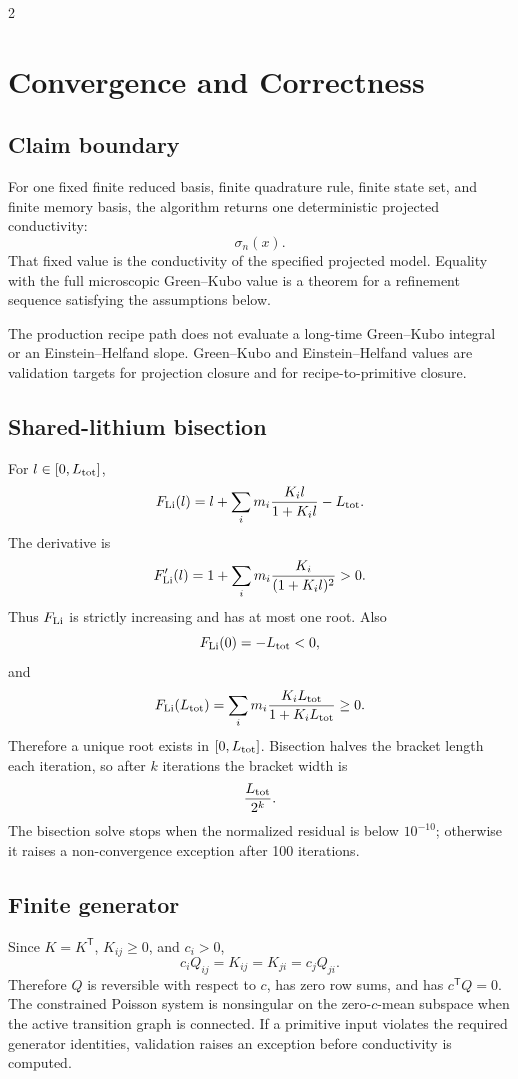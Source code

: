 \documentclass[10pt]{article}
\newcommand{\T}{\mathsf{T}}
\begin{document}
\begin{multicols}{2}
\section{Convergence and Correctness}
\label{sec:convergenceproof}

\subsection{Claim boundary}

For one fixed finite reduced basis, finite quadrature rule, finite state set,
and finite memory basis, the algorithm returns one deterministic projected
conductivity:
\[
\sigma_n(x).
\]
That fixed value is the conductivity of the specified projected model. Equality
with the full microscopic Green--Kubo value is a theorem for a refinement
sequence satisfying the assumptions below.

The production recipe path does not evaluate a long-time Green--Kubo integral
or an Einstein--Helfand slope. Green--Kubo and Einstein--Helfand values are
validation targets for projection closure and for recipe-to-primitive closure.

\subsection{Shared-lithium bisection}

For \(l\in[0,L_{\rm tot}]\),
\[
F_{\rm Li}(l)=l+\sum_i m_i\frac{K_i l}{1+K_i l}-L_{\rm tot}.
\]
The derivative is
\[
F'_{\rm Li}(l)
=
1+\sum_i m_i\frac{K_i}{(1+K_i l)^2}
>0.
\]
Thus \(F_{\rm Li}\) is strictly increasing and has at most one root. Also
\[
F_{\rm Li}(0)=-L_{\rm tot}<0,
\]
and
\[
F_{\rm Li}(L_{\rm tot})
=
\sum_i m_i\frac{K_i L_{\rm tot}}{1+K_i L_{\rm tot}}
\ge0.
\]
Therefore a unique root exists in \([0,L_{\rm tot}]\). Bisection halves the
bracket length each iteration, so after \(k\) iterations the bracket width is
\[
\frac{L_{\rm tot}}{2^k}.
\]
The bisection solve stops when the normalized residual is below \(10^{-10}\);
otherwise it raises a non-convergence exception after 100 iterations.

\subsection{Finite generator}

Since \(K=K^\T\), \(K_{ij}\ge0\), and \(c_i>0\),
\[
c_iQ_{ij}=K_{ij}=K_{ji}=c_jQ_{ji}.
\]
Therefore \(Q\) is reversible with respect to \(c\), has zero row sums, and has
\(c^\T Q=0\). The constrained Poisson system is nonsingular on the
zero-\(c\)-mean subspace when the active transition graph is connected. If a
primitive input violates the required generator identities, validation raises an
exception before conductivity is computed.


\end{multicols}
\end{document}

